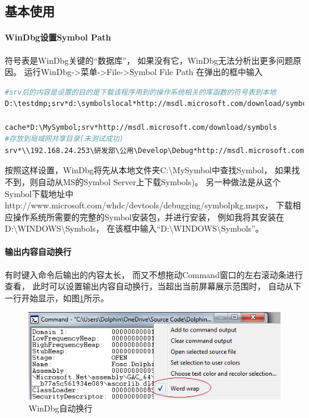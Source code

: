\documentclass{book}
\begin{document}
\subsection{基本使用}

\paragraph{WinDbg设置Symbol Path}符号表是WinDbg关键的“数据库”，
如果没有它，WinDbg无法分析出更多问题原因。
运行WinDbg->菜单->File->Symbol File Path
在弹出的框中输入

\begin{lstlisting}[language=Bash]
#srv后的内容是设置的目的是下载该程序用到的操作系统相关的库函数的符号表到本地
D:\testdmp;srv*d:\symbolslocal*http://msdl.microsoft.com/download/symbols

cache*D:\MySymbol;srv*http://msdl.microsoft.com/download/symbols
#存放到局域网共享目录(未测试成功)
srv*\\192.168.24.253\研发部\公用\Develop\Debug*http://msdl.microsoft.com/download/symbols
\end{lstlisting}

按照这样设置，WinDbg将先从本地文件夹C:\textbackslash MySymbol中查找Symbol，
如果找不到，则自动从MS的Symbol Server上下载Symbols)。
另一种做法是从这个Symbol下载地址中http://www.microsoft.com/whdc/devtools/debugging/symbolpkg.mspx，
下载相应操作系统所需要的完整的Symbol安装包，并进行安装，
例如我将其安装在D:\textbackslash WINDOWS\textbackslash Symbols，
在该框中输入“D:\textbackslash WINDOWS\textbackslash Symbols”。

\paragraph{输出内容自动换行}有时键入命令后输出的内容太长，
而又不想拖动Command窗口的左右滚动条进行查看，
此时可以设置输出内容自动换行，当超出当前屏幕展示范围时，
自动从下一行开始显示，如图\ref{fig:WinDbgAutoWrapWord}所示。

\begin{figure}[htbp]
	\centering
	\includegraphics[scale=1]{WinDbgAutoWrapWord.jpg}
	\caption{WinDbg自动换行}
	\label{fig:WinDbgAutoWrapWord}
\end{figure}
\end{document}
